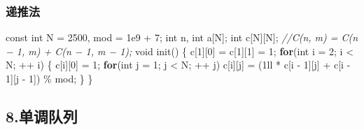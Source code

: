 \documentclass[
]{article}
\newenvironment{Shaded}{}{}
\newcommand{\AttributeTok}[1]{\textcolor[rgb]{0.49,0.56,0.16}{#1}}
\newcommand{\BuiltInTok}[1]{\textcolor[rgb]{0.00,0.50,0.00}{#1}}
\newcommand{\CommentTok}[1]{\textcolor[rgb]{0.38,0.63,0.69}{\textit{#1}}}
\newcommand{\ControlFlowTok}[1]{\textcolor[rgb]{0.00,0.44,0.13}{\textbf{#1}}}
\newcommand{\DataTypeTok}[1]{\textcolor[rgb]{0.56,0.13,0.00}{#1}}
\newcommand{\DecValTok}[1]{\textcolor[rgb]{0.25,0.63,0.44}{#1}}
\newcommand{\FloatTok}[1]{\textcolor[rgb]{0.25,0.63,0.44}{#1}}
\newcommand{\NormalTok}[1]{#1}
\newcommand{\OperatorTok}[1]{\textcolor[rgb]{0.40,0.40,0.40}{#1}}
\begin{document}
\hypertarget{ux9012ux63a8ux6cd5}{%
\subsubsection{递推法}\label{ux9012ux63a8ux6cd5}}

\begin{Shaded}
\begin{Highlighting}[]
\AttributeTok{const} \DataTypeTok{int}\NormalTok{ N }\OperatorTok{=} \DecValTok{2500}\OperatorTok{,}\NormalTok{ mod }\OperatorTok{=} \FloatTok{1e9} \OperatorTok{+} \DecValTok{7}\OperatorTok{;}
\DataTypeTok{int}\NormalTok{ n}\OperatorTok{,} 
\DataTypeTok{int}\NormalTok{ a}\OperatorTok{[}\NormalTok{N}\OperatorTok{];}
\DataTypeTok{int}\NormalTok{ c}\OperatorTok{[}\NormalTok{N}\OperatorTok{][}\NormalTok{N}\OperatorTok{];}
\CommentTok{//C(n, m) = C(n − 1, m) + C(n − 1, m − 1);}
\DataTypeTok{void}\NormalTok{ init}\OperatorTok{()}
\OperatorTok{\{}
\NormalTok{    c}\OperatorTok{[}\DecValTok{1}\OperatorTok{][}\DecValTok{0}\OperatorTok{]} \OperatorTok{=}\NormalTok{ c}\OperatorTok{[}\DecValTok{1}\OperatorTok{][}\DecValTok{1}\OperatorTok{]} \OperatorTok{=} \DecValTok{1}\OperatorTok{;}
    \ControlFlowTok{for}\OperatorTok{(}\DataTypeTok{int}\NormalTok{ i }\OperatorTok{=} \DecValTok{2}\OperatorTok{;}\NormalTok{ i }\OperatorTok{\textless{}}\NormalTok{ N}\OperatorTok{;} \OperatorTok{++}\NormalTok{ i}\OperatorTok{)} \OperatorTok{\{}
\NormalTok{        c}\OperatorTok{[}\NormalTok{i}\OperatorTok{][}\DecValTok{0}\OperatorTok{]} \OperatorTok{=} \DecValTok{1}\OperatorTok{;}
        \ControlFlowTok{for}\OperatorTok{(}\DataTypeTok{int}\NormalTok{ j }\OperatorTok{=} \DecValTok{1}\OperatorTok{;}\NormalTok{ j }\OperatorTok{\textless{}}\NormalTok{ N}\OperatorTok{;} \OperatorTok{++}\NormalTok{ j}\OperatorTok{)}
\NormalTok{            c}\OperatorTok{[}\NormalTok{i}\OperatorTok{][}\NormalTok{j}\OperatorTok{]} \OperatorTok{=} \OperatorTok{(}\DecValTok{1}\BuiltInTok{ll} \OperatorTok{*}\NormalTok{ c}\OperatorTok{[}\NormalTok{i }\OperatorTok{{-}} \DecValTok{1}\OperatorTok{][}\NormalTok{j}\OperatorTok{]} \OperatorTok{+}\NormalTok{ c}\OperatorTok{[}\NormalTok{i }\OperatorTok{{-}} \DecValTok{1}\OperatorTok{][}\NormalTok{j }\OperatorTok{{-}} \DecValTok{1}\OperatorTok{])} \OperatorTok{\%}\NormalTok{ mod}\OperatorTok{;}
    \OperatorTok{\}}
\OperatorTok{\}}
\end{Highlighting}
\end{Shaded}

\hypertarget{8ux5355ux8c03ux961fux5217}{%
\subsection{8.单调队列}\label{8ux5355ux8c03ux961fux5217}}
\end{document}
